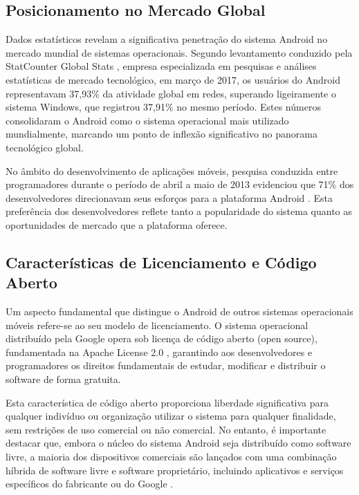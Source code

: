 \documentclass[
	12pt,				    %
	openright,			    %
	oneside,			    %
	a4paper,			    %
    sumario=tradicional,    %
	english,			    %
	brazil,				    %
	]{abntex2}              %
\begin{document}
\subsection{Posicionamento no Mercado Global}

Dados estatísticos revelam a significativa penetração do sistema Android no mercado mundial de sistemas operacionais. Segundo levantamento conduzido pela StatCounter Global Stats \cite{statcounter2017}, empresa especializada em pesquisas e análises estatísticas de mercado tecnológico, em março de 2017, os usuários do Android representavam 37,93\% da atividade global em redes, superando ligeiramente o sistema Windows, que registrou 37,91\% no mesmo período. Estes números consolidaram o Android como o sistema operacional mais utilizado mundialmente, marcando um ponto de inflexão significativo no panorama tecnológico global.

No âmbito do desenvolvimento de aplicações móveis, pesquisa conduzida entre programadores durante o período de abril a maio de 2013 evidenciou que 71\% dos desenvolvedores direcionavam seus esforços para a plataforma Android \cite{developereconomics2013}. Esta preferência dos desenvolvedores reflete tanto a popularidade do sistema quanto as oportunidades de mercado que a plataforma oferece.

\subsection{Características de Licenciamento e Código Aberto}

Um aspecto fundamental que distingue o Android de outros sistemas operacionais móveis refere-se ao seu modelo de licenciamento. O sistema operacional distribuído pela Google opera sob licença de código aberto (open source), fundamentada na Apache License 2.0 \cite{opensource2023}, garantindo aos desenvolvedores e programadores os direitos fundamentais de estudar, modificar e distribuir o software de forma gratuita.

Esta característica de código aberto proporciona liberdade significativa para qualquer indivíduo ou organização utilizar o sistema para qualquer finalidade, sem restrições de uso comercial ou não comercial. No entanto, é importante destacar que, embora o núcleo do sistema Android seja distribuído como software livre, a maioria dos dispositivos comerciais são lançados com uma combinação híbrida de software livre e software proprietário, incluindo aplicativos e serviços específicos do fabricante ou do Google \cite{lee2022}.
\end{document}
